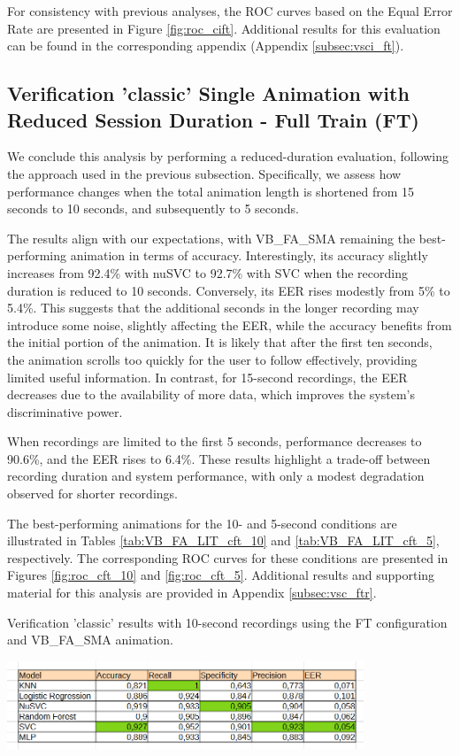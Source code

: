 \documentclass[12pt]{report}
\begin{document}
For consistency with previous analyses, the ROC curves based on the Equal Error Rate are presented in Figure \ref{fig:roc_cift}. 
Additional results for this evaluation can be found in the corresponding appendix (Appendix \ref{subsec:vsci_ft}).
\FloatBarrier

\subsection{Verification 'classic' Single Animation with Reduced Session Duration - Full Train (FT)}

We conclude this analysis by performing a reduced-duration evaluation, following the approach used in the previous subsection. 
Specifically, we assess how performance changes when the total animation length is shortened from 15 seconds to 10 seconds, and subsequently to 5 seconds.

The results align with our expectations, with VB\_FA\_SMA remaining the best-performing animation in terms of accuracy. 
Interestingly, its accuracy slightly increases from 92.4\% with nuSVC to 92.7\% with SVC when the recording duration is reduced to 10 seconds. 
Conversely, its EER rises modestly from 5\% to 5.4\%. 
This suggests that the additional seconds in the longer recording may introduce some noise, slightly affecting the EER, while the accuracy benefits from the initial portion of the animation. 
It is likely that after the first ten seconds, the animation scrolls too quickly for the user to follow effectively, providing limited useful information. 
In contrast, for 15-second recordings, the EER decreases due to the availability of more data, which improves the system’s discriminative power.

When recordings are limited to the first 5 seconds, performance decreases to 90.6\%, and the EER rises to 6.4\%. 
These results highlight a trade-off between recording duration and system performance, with only a modest degradation observed for shorter recordings.

The best-performing animations for the 10- and 5-second conditions are illustrated in Tables \ref{tab:VB_FA_LIT_cft_10} and \ref{tab:VB_FA_LIT_cft_5}, respectively. 
The corresponding ROC curves for these conditions are presented in Figures \ref{fig:roc_cft_10} and \ref{fig:roc_cft_5}.
Additional results and supporting material for this analysis are provided in Appendix \ref{subsec:vsc_ftr}.

\begin{table}[ht]
    \centering
    \caption{Verification ’classic’ results with 10-second recordings using the FT configuration and VB\_FA\_SMA animation.}
    \includegraphics[width=0.8\textwidth]{Images/Results/Classic_procedure/five_ten/ft/ten/VB_FA_LIT.png}
    \label{tab:VB_FA_LIT_cft_10}
\end{table}
\end{document}
